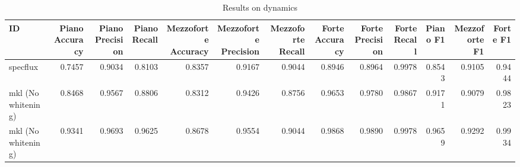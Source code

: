 \begin{table}
\centering
\caption{Results on dynamics}
\label{tb:dynsol}
\begin{tabular}{lrrrrrrrrrrrr}
\toprule
                 ID &  Piano Accuracy &  Piano Precision &  Piano Recall &  Mezzoforte Accuracy &  Mezzoforte Precision &  Mezzoforte Recall &  Forte Accuracy &  Forte Precision &  Forte Recall &  Piano F1 &  Mezzoforte F1 &  Forte F1 \\
\midrule
           specflux &          0.7457 &           0.9034 &        0.8103 &               0.8357 &                0.9167 &             0.9044 &          0.8946 &           0.8964 &        0.9978 &    0.8543 &         0.9105 &    0.9444 \\
 mkl (No whitening) &          0.8468 &           0.9567 &        0.8806 &               0.8312 &                0.9426 &             0.8756 &          0.9653 &           0.9780 &        0.9867 &    0.9171 &         0.9079 &    0.9823 \\
 mkl (No whitening) &          0.9341 &           0.9693 &        0.9625 &               0.8678 &                0.9554 &             0.9044 &          0.9868 &           0.9890 &        0.9978 &    0.9659 &         0.9292 &    0.9934 \\
\bottomrule
\end{tabular}
\end{table}
